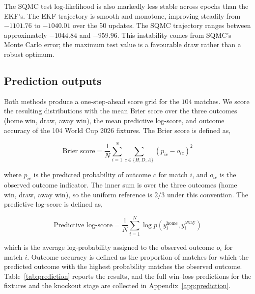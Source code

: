 The SQMC test log-likelihood is also markedly less stable across epochs than the EKF's. The EKF trajectory is smooth and monotone, improving steadily from $-1101.76$ to $-1040.01$ over the 50 updates. The SQMC trajectory ranges between approximately $-1044.84$ and $-959.96$. This instability comes from SQMC's Monte Carlo error; the maximum test value is a favourable draw rather than a robust optimum.

\subsection{Prediction outputs}

Both methods produce a one-step-ahead score grid for the $104$ matches. We score the resulting distributions with the mean Brier score over the three outcomes (home win, draw, away win), the mean predictive log-score, and outcome accuracy of the 104 World Cup 2026 fixtures. The Brier score is defined as,

\begin{equation*}
    \text{Brier score} = \frac{1}{N} \sum_{i=1}^N \sum_{c\in\{H,D,A\}} (p_{ic} - o_{ic})^2
\end{equation*}

where $p_{ic}$ is the predicted probability of outcome $c$ for match $i$, and $o_{ic}$ is the observed outcome indicator. The inner sum is over the three outcomes (home win, draw, away win), so the uniform reference is $2/3$ under this convention. The predictive log-score is defined as,

\begin{equation*}
    \text{Predictive log-score} = \frac{1}{N} \sum_{i=1}^N \log p(y_i^{\text{home}}, y_i^{\text{away}})
\end{equation*}

which is the average log-probability assigned to the observed outcome $o_i$ for match $i$. Outcome accuracy is defined as the proportion of matches for which the predicted outcome with the highest probability matches the observed outcome. Table~\ref{tab:prediction} reports the results, and the full win--loss predictions for the fixtures and the knockout stage are collected in Appendix~\ref{app:prediction}.

